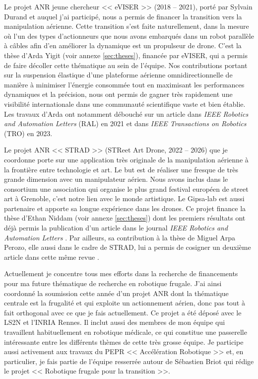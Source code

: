 \documentclass[a4paper,12pt]{article}
\begin{document}
Le projet ANR jeune chercheur << eVISER >> (2018 -- 2021), porté par Sylvain Durand et auquel j'ai participé, nous a permis de financer la transition vers la manipulation aérienne. Cette transition s'est faite naturellement, dans la mesure où l'un des types d'actionneurs que nous avons embarqués dans un robot parallèle à câbles afin d'en améliorer la dynamique est un propulseur de drone. C'est la thèse d'Arda Yigit (voir annexe \ref{sec:theses}), financée par eVISER, qui a permis de faire décoller cette thématique au sein de l'équipe. Nos contributions portant sur la suspension élastique d'une plateforme aérienne omnidirectionnelle de manière à minimiser l'énergie consommée tout en maximisant les performances dynamiques et la précision, nous ont permis de gagner très rapidement une visibilité internationale dans une communauté scientifique vaste et bien établie. Les travaux d'Arda ont notamment débouché sur un article dans \textit{IEEE Robotics and Automation Letters} (RAL) \cite{2-YACD21} en 2021 et dans \textit{IEEE Transactions on Robotics} (TRO) \cite{2-YCAD23} en 2023.

Le projet ANR << STRAD >> (STReet Art Drone, 2022 -- 2026) que je coordonne porte sur une application très originale de la manipulation aérienne à la frontière entre technologie et art. Le but est de réaliser une fresque de très grande dimension avec un manipulateur aérien. Nous avons inclus dans le consortium une association qui organise le plus grand festival européen de street art à Grenoble, c'est notre lien avec le monde artistique. Le Gipsa-lab est aussi partenaire et apporte sa longue expérience dans les drones. Ce projet finance la thèse d'Ethan Niddam (voir annexe \ref{sec:theses}) dont les premiers résultats ont déjà permis la publication d'un article dans le journal \textit{IEEE Robotics and Automation Letters} \cite{2-NDCD24}. Par ailleurs, sa contribution à la thèse de Miguel Arpa Perozo, elle aussi dans le cadre de STRAD, lui a permis de cosigner un deuxième article dans cette même revue \cite{2-ANCDxx}.

Actuellement je concentre tous mes efforts dans la recherche de financements pour ma future thématique de recherche en robotique frugale. J'ai ainsi coordonné la soumission cette année d'un projet ANR dont la thématique centrale est la frugalité et qui exploite un actionnement aérien, donc pas tout à fait orthogonal avec ce que je fais actuellement. Ce projet a été déposé avec le LS2N et l'INRIA Rennes. Il inclut aussi des membres de mon équipe qui travaillent habituellement en robotique médicale, ce qui constitue une passerelle intéressante entre les différents thèmes de cette très grosse équipe. Je participe aussi activement aux travaux du PEPR << Accélération Robotique >> et, en particulier, je fais partie de l'équipe resserrée autour de Sébastien Briot qui rédige le projet << Robotique frugale pour la transition >>.
\end{document}

